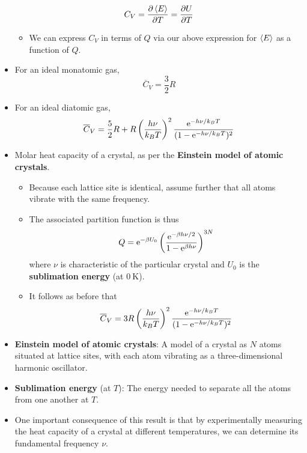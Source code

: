 \documentclass[../notes.tex]{subfiles}
\begin{document}
\begin{itemize}
\begin{equation*}
        C_V = \pdv{\prb{E}}{T} = \pdv{U}{T}
    \end{equation*}
    \begin{itemize}
        \item We can express $C_V$ in terms of $Q$ via our above expression for $\prb{E}$ as a function of $Q$.
    \end{itemize}
    \item For an ideal monatomic gas,
    \begin{equation*}
        \overline{C}_V = \frac{3}{2}R
    \end{equation*}
    \item For an ideal diatomic gas,
    \begin{equation*}
        \overline{C}_V = \frac{5}{2}R+R\left( \frac{h\nu}{k_BT} \right)^2\frac{\e[-h\nu/k_BT]}{(1-\e[-h\nu/k_BT])^2}
    \end{equation*}
    \item Molar heat capacity of a crystal, as per the \textbf{Einstein model of atomic crystals}.
    \begin{itemize}
        \item Because each lattice site is identical, assume further that all atoms vibrate with the same frequency.
        \item The associated partition function is thus
        \begin{equation*}
            Q = \e[-\beta U_0]\left( \frac{\e[-\beta h\nu/2]}{1-\e[\beta h\nu]} \right)^{3N}
        \end{equation*}
        where $\nu$ is characteristic of the particular crystal and $U_0$ is the \textbf{sublimation energy} (at $\SI{0}{\kelvin}$).
        \item It follows as before that
        \begin{equation*}
            \overline{C}_V = 3R\left( \frac{h\nu}{k_BT} \right)^2\frac{\e[-h\nu/k_BT]}{(1-\e[-h\nu/k_BT])^2}
        \end{equation*}
    \end{itemize}
    \item \textbf{Einstein model of atomic crystals}: A model of a crystal as $N$ atoms situated at lattice sites, with each atom vibrating as a three-dimensional harmonic oscillator.
    \item \textbf{Sublimation energy} (at $T$): The energy needed to separate all the atoms from one another at $T$.
    \item One important consequence of this result is that by experimentally measuring the heat capacity of a crystal at different temperatures, we can determine its fundamental frequency $\nu$.

\end{itemize}
\end{document}
